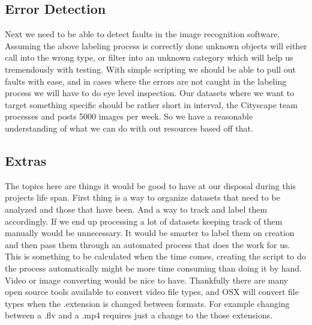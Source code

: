 \documentclass[10pt,draftclsnofoot,onecolumn,journal,compsoc]{IEEEtran}
\begin{document}
    \subsection{Error Detection}
Next we need to be able to detect faults in the image recognition software. Assuming the above labeling process is correctly done unknown objects will either call into the wrong type, or filter into an unknown category which will help us tremendously with testing. With simple scripting we should be able to pull out faults with ease, and in cases where the errors are not caught in the labeling process we will have to do eye level inspection. Our datasets where we want to target something specific should be rather short in interval, the Cityscape team processes and posts 5000 images per week. So we have a reasonable understanding of what we can do with out resources based off that.
	\subsection{Extras}
    The topics here are things it would be good to have at our disposal during this projects life span. First thing is a way to organize datasets that need to be analyzed and those that have been. And a way to track and label them accordingly. If we end up processing a lot of datasets keeping track of them manually would be unnecessary. It would be smarter to label them on creation and then pass them through an automated process that does the work for us. This is something to be calculated when the time comes, creating the script to do the process automatically might be more time consuming than doing it by hand. 
   Video or image converting would be nice to have. Thankfully there are many open source tools available to convert video file types, and OSX will convert file types when the .extension is changed between formats. For example changing between a .flv and a .mp4 requires just a change to the those extensions. 
   


 
\newcommand{\firstdayoffallterm}{2016-09-21}      %
\newcommand{\startday}{2016-10-02}                %
\newcommand{\fallprogressreportdue}{2016-12-05}   %
\newcommand{\alphareleasedue}{2017-02-13}         %
\newcommand{\betareleasedue}{2017-03-20}          %
\newcommand{\winterprogressreportdue}{2017-03-20} %
\newcommand{\releasedue}{2017-05-15}              %
\newcommand{\expoday}{2017-05-19}                 %
\newcommand{\finalreportdue}{2017-06-12}          %
\newcommand{\lastdayofspringterm}{2017-06-16}     %
\end{document}
